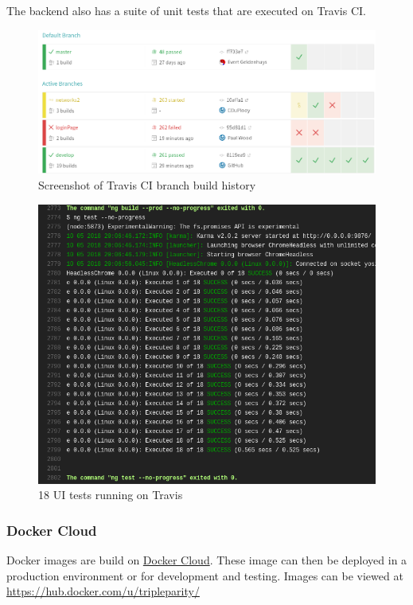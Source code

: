 \documentclass[]{article}
\begin{document}
The backend also has a suite of unit tests that are executed on Travis CI.

\begin{figure}[H]
	\centering
	\includegraphics[scale=0.5]{travis_build_history.png}
	\caption{Screenshot of Travis CI branch build history}
\end{figure}

\begin{figure}[H]
	\centering
	\includegraphics[scale=0.5]{travis_ui_tests_output_1.png}
	\caption{18 UI tests running on Travis}
\end{figure}

\subsubsection{Docker Cloud}
Docker images are build on \href{https://cloud.docker.com/}{Docker Cloud}.
These image can then be deployed in a production environment or for development and testing.
Images can be viewed at \url{https://hub.docker.com/u/tripleparity/}
\end{document}
